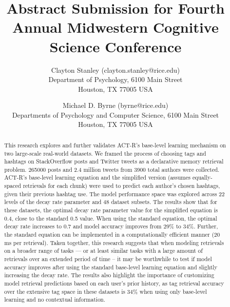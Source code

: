 \documentclass[english]{article}
\title{Abstract Submission for Fourth Annual Midwestern Cognitive Science Conference}
\author{Clayton Stanley (clayton.stanley@rice.edu) \\
  Department of Psychology, 6100 Main Street \\
  Houston, TX 77005 USA 
  \and Michael D. Byrne (byrne@rice.edu) \\
  Departments of Psychology and Computer Science, 6100 Main Street \\
  Houston, TX 77005 USA \\
}
\begin{document}
\maketitle

\begin{abstract}
  This research explores and further validates ACT-R's base-level learning mechanism on two large-scale real-world datasets.
  We framed the process of choosing tags and hashtags on StackOverflow posts and Twitter tweets as a declarative memory retrieval problem.
  \num{265000} posts and 2.4 million tweets from \num{3900} total authors were collected. 
  ACT-R's base-level learning equation and the simplified version (assumes equally-spaced retrievals for each chunk) were used to predict each author's chosen hashtags, given their previous hashtag use.
  The model performance space was explored across 22 levels of the decay rate parameter and 48 dataset subsets.
  The results show that for these datasets, the optimal decay rate parameter value for the simplified equation is 0.4, close to the standard 0.5 value. 
  When using the standard equation, the optimal decay rate increases to 0.7 and model accuracy improves from 29\% to 34\%. 
  Further, the standard equation can be implemented in a computationally efficient manner (20 ms per retrieval).
  Taken together, this research suggests that when modeling retrievals on a broader range of tasks --- or at least similar tasks with a large amount of retrievals over an extended period of time --
  it may be worthwhile to test if model accuracy improves after using the standard base-level learning equation and slightly increasing the decay rate.
  The results also highlight the importance of customizing model retrieval predictions based on each user's prior history,
  as tag retrieval accuracy over the extensive tag space in these datasets is 34\% when using only base-level learning and no contextual information.
\end{abstract}
\end{document}
